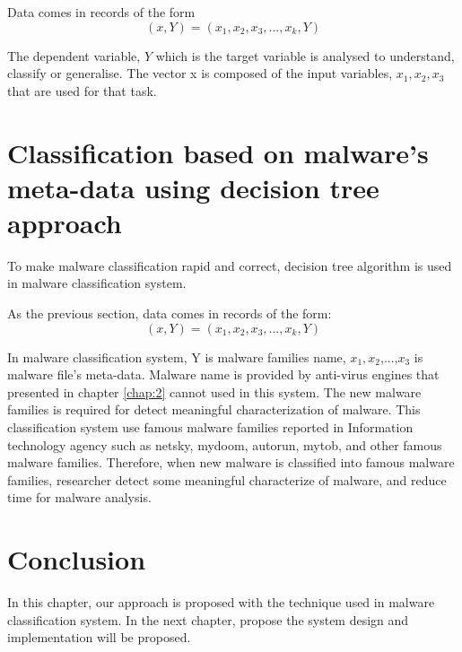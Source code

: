 Data comes in records of the form
\begin{equation}
    (x,Y) = (x_1, x_2, x_3, ..., x_k, Y) 
\end{equation}

The dependent variable, $Y$ which is the target variable is analysed to understand, classify or generalise. The vector x is composed of the input variables, $x_{1}, x_{2}, x_{3}$ that are used for that task.
\section{Classification based on malware's meta-data using decision tree approach}

To make malware classification rapid and correct, decision tree algorithm is used in malware classification system.

As the previous section, data comes in records of the form:\begin{equation}
    (x,Y) = (x_1, x_2, x_3, ..., x_k, Y) 
\end{equation}

In malware classification system, Y is malware families name, $x_{1}, x_{2}$,...,$x_{3}$ is malware file's meta-data. Malware name is provided by anti-virus engines that presented in chapter \ref{chap:2} cannot used in this system. The new malware families is required for detect meaningful characterization of malware. This classification system use famous malware families reported in Information technology agency such as netsky, mydoom, autorun, mytob, and other famous malware families. Therefore, when new malware is classified into famous malware families, researcher detect some meaningful characterize of malware, and reduce time for malware analysis. 
\section{Conclusion}
In this chapter, our approach is proposed with the technique used in malware classification system.
In the next chapter, propose the system design and implementation will be proposed.